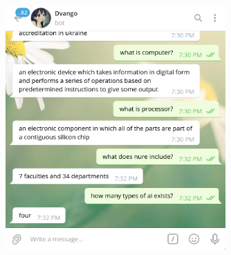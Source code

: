 \documentclass[a4paper,14pt]{extreport}
\begin{document}
    \begin{figure}[H]
        \centering
        \includegraphics[width=0.75\textwidth]{f3.png}
    \end{figure}
\end{document}
